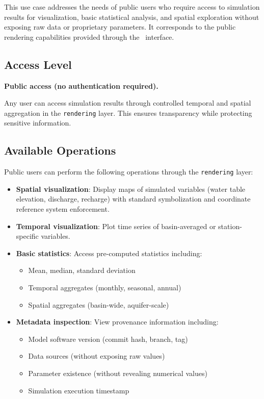 This use case addresses the needs of public users who require access to simulation results for visualization, basic statistical analysis, and spatial exploration without exposing raw data or proprietary parameters. It corresponds to the public rendering capabilities provided through the \cwv\ interface.

\subsection{Access Level}

\textbf{Public access (no authentication required).}

Any user can access simulation results through controlled temporal and spatial aggregation in the \texttt{rendering} layer. This ensures transparency while protecting sensitive information.

\subsection{Available Operations}

Public users can perform the following operations through the \texttt{rendering} layer:

\begin{itemize}
\item \textbf{Spatial visualization}: Display maps of simulated variables (water table elevation, discharge, recharge) with standard symbolization and coordinate reference system enforcement.

\item \textbf{Temporal visualization}: Plot time series of basin-averaged or station-specific variables.

\item \textbf{Basic statistics}: Access pre-computed statistics including:
\begin{itemize}
    \item Mean, median, standard deviation
    \item Temporal aggregates (monthly, seasonal, annual)
    \item Spatial aggregates (basin-wide, aquifer-scale)
\end{itemize}

\item \textbf{Metadata inspection}: View provenance information including:
\begin{itemize}
    \item Model software version (commit hash, branch, tag)
    \item Data sources (without exposing raw values)
    \item Parameter existence (without revealing numerical values)
    \item Simulation execution timestamp
\end{itemize}
\end{itemize}

